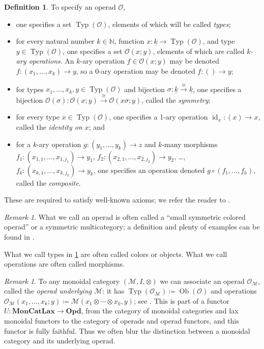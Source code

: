 \documentclass[11pt, article, oneside]{memoir}
\theoremstyle{plain}
\theoremstyle{definition}
\newtheorem{definition}[theorem]{Definition}
\theoremstyle{remark}
\newtheorem{remark}[theorem]{Remark}
\newcommand{\cat}[1]{\mathcal{#1}}
\newcommand{\Cat}[1]{\mathbf{#1}}
\DeclareMathOperator{\id}{id}
\DeclareMathOperator{\Ob}{Ob}
\DeclareMathOperator{\Typ}{Typ}
\newcommand{\NN}{\mathbb{N}}
\newcommand{\To}[1]{\xrightarrow{#1}}
\newcommand{\ul}[1]{\underline{#1}}
\newcommand{\OO}{\cat{O}}
\begin{document}
\begin{definition}\label{def.operad}
To specify an operad $\OO$,
\begin{itemize}
	\item one specifies a set $\Typ(\OO)$, elements of which will be called \emph{types};
	\item for every natural number $k\in\NN$, function $x\colon\ul{k}\to\Typ(\OO)$, and type $y\in\Typ(\OO)$, one specifies a set $\OO(x;y)$, elements of which are called \emph{$k$-ary operations}. An $k$-ary operation $f\in\OO(x;y)$ may be denoted $f\colon(x_1,\ldots,x_k)\to y$, so a $0$-ary operation may be denoted $f\colon()\to y$;
	\item for types $x_1,\ldots,x_k,y\in\Typ(\OO)$ and bijection $\sigma\colon\ul{k}\To{\cong}\ul{k}$, one specifies a bijection $\OO(\sigma)\colon\OO(x;y)\To\cong\OO(x\sigma;y)$, called the \emph{symmetry};
	\item for every type $x\in\Typ(\OO)$, one specifies a 1-ary operation $\id_x\colon(x)\to x$, called the \emph{identity on $x$}; and
	\item for a $k$-ary operation $g\colon(y_1,\ldots,y_k)\to z$ and $k$-many morphisms $f_1\colon(x_{1,1},\ldots,x_{1,j_1})\to y_1$, $f_2\colon(x_{2,1},\ldots,x_{2,j_2})\to y_2$, \ldots, $f_k\colon(x_{k,1},\ldots,x_{k,j_k})\to y_k$, one specifies an operation denoted $g\circ(f_1,\ldots,f_k)$, called the \emph{composite}.
\end{itemize}
These are required to satisfy well-known axioms; we refer the reader to \cite[Definition 2.2.21(?)]{Leinster:2004a}.
\end{definition}

\begin{remark}
What we call an operad is often called a ``small symmetric colored operad'' or a symmetric multicategory; a definition and plenty of examples can be found in \cite{Leinster:2004a}.

What we call types in \cref{def.operad} are often called colors or objects. What we call operations are often called morphisms.
\end{remark}

\begin{remark}\label{rem.mon_cat_operad_blur}
To any monoidal category $(\cat{M},I,\otimes)$ we can associate an operad $\OO_\cat{M}$, called the \emph{operad underlying $\cat{M}$}: it has $\Typ(\OO_\cat{M})\coloneqq\Ob(\cat{O})$ and operations $\OO_{\cat{M}}(x_1,\ldots,x_k;y)\coloneqq\cat{M}(x_1\otimes\cdots\otimes x_k,y)$; see \cite{Leinster:2004a}. This is part of a functor $U\colon\Cat{MonCatLax}\to\Cat{Opd}$, from the category of monoidal categories and lax monoidal functors to the category of operads and operad functors, and this functor is fully faithful. Thus we often blur the distinction between a monoidal category and its underlying operad.
\end{remark}
\end{document}
